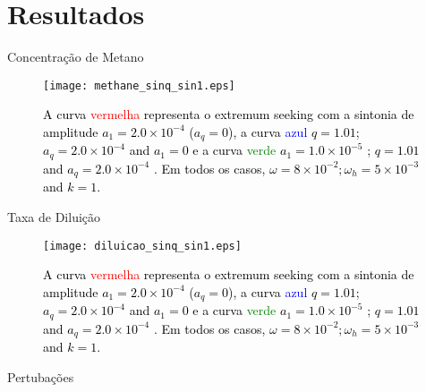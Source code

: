 \documentclass{beamer}
\begin{document}
\section{Resultados}
\begin{frame}{Concentração de Metano}
\begin{figure}[h!]
\centering
\texttt{[image: methane\_sinq\_sin1.eps]}
\caption{\textcolor{black}{A curva \textcolor{red}{vermelha} representa o extremum seeking
	com a sintonia de amplitude $a_1 = 2.0 \times 10^{-4} $ ($a_q = 0$), a curva  \textcolor{blue}{azul}  $q = 1.01$; $a_q = 2.0 \times 10^{-4}$ and $a_1 = 0$ e a curva \textcolor{green}{verde} $a_1 = 1.0 \times 10^{-5}$ ; $q = 1.01$ and $a_q = 2.0 \times 10^{-4}$ . Em todos os casos, $\omega = 8 \times 10^{-2} ; \omega_h = 5 \times 10^{-3}$ and $k = 1$.}}
\label{fig:LRmethane}
\end{figure}
\end{frame}

\begin{frame}{Taxa de Diluição}
\begin{figure}[h!]
\centering
\texttt{[image: diluicao\_sinq\_sin1.eps]}
\caption{\textcolor{black}{A curva \textcolor{red}{vermelha} representa o extremum seeking
	com a sintonia de amplitude $a_1 = 2.0 \times 10^{-4} $ ($a_q = 0$), a curva  \textcolor{blue}{azul}  $q = 1.01$; $a_q = 2.0 \times 10^{-4}$ and $a_1 = 0$ e a curva \textcolor{green}{verde} $a_1 = 1.0 \times 10^{-5}$ ; $q = 1.01$ and $a_q = 2.0 \times 10^{-4}$ . Em todos os casos, $\omega = 8 \times 10^{-2} ; \omega_h = 5 \times 10^{-3}$ and $k = 1$.}}
\label{fig:LRdilution}
\end{figure}
\end{frame}


\begin{frame}{Pertubações}

\begin{figure}[h!]
    \centering
    \qquad
    \qquad
    \qquad
    \qquad
    \label{fig:disturbance}%
\end{figure}

\end{frame}
\end{document}
